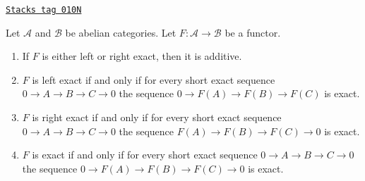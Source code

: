 \begin{lemma}
\label{homology-lemma-exact-functor}
\href{https://stacks.math.columbia.edu/tag/010N}{\texttt{Stacks tag 010N}}

Let $\mathcal{A}$ and $\mathcal{B}$ be abelian categories.
Let $F : \mathcal{A} \to \mathcal{B}$ be a functor.
\begin{enumerate}
\item If $F$ is either left or right exact, then it is additive.
\item $F$ is left exact if and only if
for every short exact sequence
$0 \to A \to B \to C \to 0$
the sequence $0 \to F(A) \to F(B) \to F(C)$
is exact.
\item $F$ is right exact if and only if for every short exact sequence
$0 \to A \to B \to C \to 0$
the sequence $F(A) \to F(B) \to F(C) \to 0$
is exact.
\item $F$ is exact if and only if for every short exact sequence
$0 \to A \to B \to C \to 0$
the sequence $0 \to F(A) \to F(B) \to F(C) \to 0$
is exact.
\end{enumerate}
\end{lemma}

